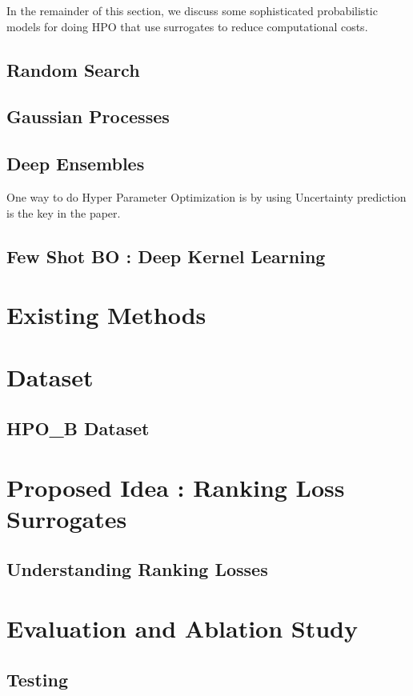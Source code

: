 \documentclass[11pt]{article}
\begin{document}
In the remainder of this section, we discuss some sophisticated probabilistic models for doing HPO that use surrogates to reduce computational costs.


\subsection{Random Search}

\subsection{Gaussian Processes}
\subsection{Deep Ensembles}
One way to do Hyper Parameter Optimization is by using 
Uncertainty prediction is the key in the paper. \cite{DeepEnsemblePaper}

\subsection{Few Shot BO : Deep Kernel Learning}


\section{Existing Methods}

\section{Dataset}
\subsection{HPO\_B Dataset}

\section{Proposed Idea : Ranking Loss Surrogates}

\subsection{Understanding Ranking Losses}



\section{Evaluation and Ablation Study}
\subsection{Testing}
\end{document}
